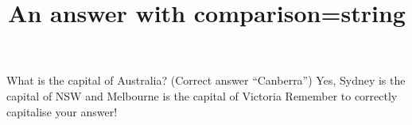 \documentclass[hidesidemenu]{webquiztex}
\title{An answer with comparison=string}
\begin{document}
  \begin{question}     %
     What is the capital of Australia?
      (Correct answer ``Canberra'')
     \whenRight  Yes, Sydney is the capital of NSW and Melbourne is the
     capital of Victoria
     \whenWrong Remember to correctly capitalise your answer!
  \end{question}
\end{document}
